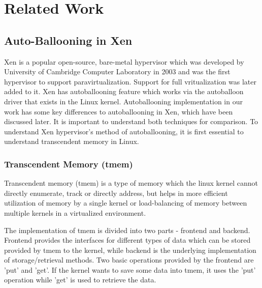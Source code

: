 \chapter{Related Work}
\label{chap:related}

\section{Auto-Ballooning in Xen}
Xen is a popular open-source, bare-metal hypervisor which was developed by University of Cambridge Computer Laboratory in 2003 and was the first hypervisor to support paravirtualization. Support for full vritualization was later added to it. Xen has autoballooning feature which works via the autoballoon driver that exists in the Linux kernel. Autoballooning implementation in our work has some key differences to autoballooning in Xen, which have been discussed later. It is important to understand both techniques for comparison. To understand Xen hypervisor's method of autoballooning, it is first essential to understand transcendent memory in Linux.

\subsection{Transcendent Memory (tmem)}
Transcendent memory (tmem) \cite{magenheimer2009transcendent} is a type of memory which the linux kernel cannot directly enumerate, track or directly address, but helps in more efficient utilization of memory by a single kernel or load-balancing of memory between multiple kernels in a virtualized environment. 

The implementation of tmem is divided into two parts - frontend and backend. Frontend provides the interfaces for different types of data which can be stored provided by tmem to the kernel, while backend is the underlying implementation of storage/retrieval methods. Two basic operations provided by the frontend are 'put' and 'get'. If the kernel wants to save some data into tmem, it uses the 'put' operation while 'get' is used to retrieve the data.

